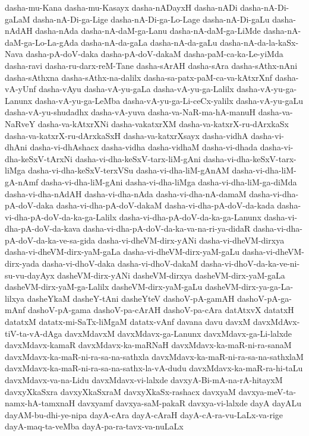 {dasha-mu-Kana
dasha-mu-Kasayx
dasha-nADayxH
dasha-nADi
dasha-nA-Di-gaLaM
dasha-nA-Di-ga-Lige
dasha-nA-Di-ga-Lo-Lage
dasha-nA-Di-gaLu
dasha-nAdAH
dasha-nAda
dasha-nA-daM-ga-Lanu
dasha-nA-daM-ga-LiMde
dasha-nA-daM-ga-Lo-La-gAda
dasha-nA-da-gaLa
dasha-nA-da-gaLu
dasha-nA-da-la-kaSx-Nava
dasha-pA-doV-daka
dasha-pA-doV-dakaM
dasha-paM-ca-ka-Le-yiMda
dasha-ravi
dasha-ru-darx-reM-Tane
dasha-sArAH
dasha-sAra
dasha-sAthx-nAni
dasha-sAthxna
dasha-sAthx-na-dalilx
dasha-sa-patx-paM-ca-va-kAtxrXnf
dasha-vA-yUnf
dasha-vAyu
dasha-vA-yu-gaLa
dasha-vA-yu-ga-Lalilx
dasha-vA-yu-ga-Lanunx
dasha-vA-yu-ga-LeMba
dasha-vA-yu-ga-Li-ceCx-yalilx
dasha-vA-yu-gaLu
dasha-vA-yu-shudadhx
dasha-vA-yuva
dasha-va-NaR-ma-hA-manuH
dasha-va-NaRveY
dasha-va-kAtxrXNi
dasha-vakatxrXM
dasha-va-katxrX-ru-dArxkaSx
dasha-va-katxrX-ru-dArxkaSxH
dasha-va-katxrXsayx
dasha-vidhA
dasha-vi-dhAni
dasha-vi-dhAshacx
dasha-vidha
dasha-vidhaM
dasha-vi-dhada
dasha-vi-dha-keSxV-tArxNi
dasha-vi-dha-keSxV-tarx-liM-gAni
dasha-vi-dha-keSxV-tarx-liMga
dasha-vi-dha-keSxV-terxVSu
dasha-vi-dha-liM-gAnAM
dasha-vi-dha-liM-gA-nAmf
dasha-vi-dha-liM-gAni
dasha-vi-dha-liMga
dasha-vi-dha-liM-ga-diMda
dasha-vi-dha-nAdAH
dasha-vi-dha-nAda
dasha-vi-dha-nA-damaM
dasha-vi-dha-pA-doV-daka
dasha-vi-dha-pA-doV-dakaM
dasha-vi-dha-pA-doV-da-kada
dasha-vi-dha-pA-doV-da-ka-ga-Lalilx
dasha-vi-dha-pA-doV-da-ka-ga-Lanunx
dasha-vi-dha-pA-doV-da-kava
dasha-vi-dha-pA-doV-da-ka-va-na-ri-ya-didaR
dasha-vi-dha-pA-doV-da-ka-ve-sa-gida
dasha-vi-dheVM-dirx-yANi
dasha-vi-dheVM-dirxya
dasha-vi-dheVM-dirx-yaM-gaLa
dasha-vi-dheVM-dirx-yaM-gaLu
dasha-vi-dheVM-dirx-yada
dasha-vi-dhoV-daka
dasha-vi-dhoV-dakaM
dasha-vi-dhoV-da-ka-ve-ni-su-vu-dayAyx
dasheVM-dirx-yANi
dasheVM-dirxya
dasheVM-dirx-yaM-gaLa
dasheVM-dirx-yaM-ga-Lalilx
dasheVM-dirx-yaM-gaLu
dasheVM-dirx-ya-ga-La-lilxya
dasheYkaM
dasheY-tAni
dasheYteV
dashoV-pA-gamAH
dashoV-pA-ga-mAnf
dashoV-pA-gama
dashoV-pa-cArAH
dashoV-pa-cAra
datAtxvX
datatxH
datatxM
datatx-mi-SaTx-liMgaM
datatx-vAnf
davana
davu
davxM
davxMdAvx-tiV-ta-vA-dAga
davxMdavxM
davxMdavx-ga-Lanunx
davxMdavx-ga-Li-lalxde
davxMdavx-kamaR
davxMdavx-ka-maRNaH
davxMdavx-ka-maR-ni-ra-sanaM
davxMdavx-ka-maR-ni-ra-sa-na-sathxla
davxMdavx-ka-maR-ni-ra-sa-na-sathxlaM
davxMdavx-ka-maR-ni-ra-sa-na-sathx-la-vA-dudu
davxMdavx-ka-maR-ra-hi-taLu
davxMdavx-va-na-Lidu
davxMdavx-vi-lalxde
davxyA-Bi-mA-na-rA-hitayxM
davxyXkaSxra
davxyXkaSxraM
davxyXkaSx-rashacx
davxyaM
davxya-meV-ta-namx-hA-tamxnaH
davxyamf
davxya-saM-pakaR
davxya-vi-lalxde
dayA
dayALu
dayAM-bu-dhi-ye-nipa
dayA-cAra
dayA-cAraH
dayA-cA-ra-vu-LaLx-va-rige
dayA-maq-ta-veMba
dayA-pa-ra-tavx-va-nuLaLx
}
